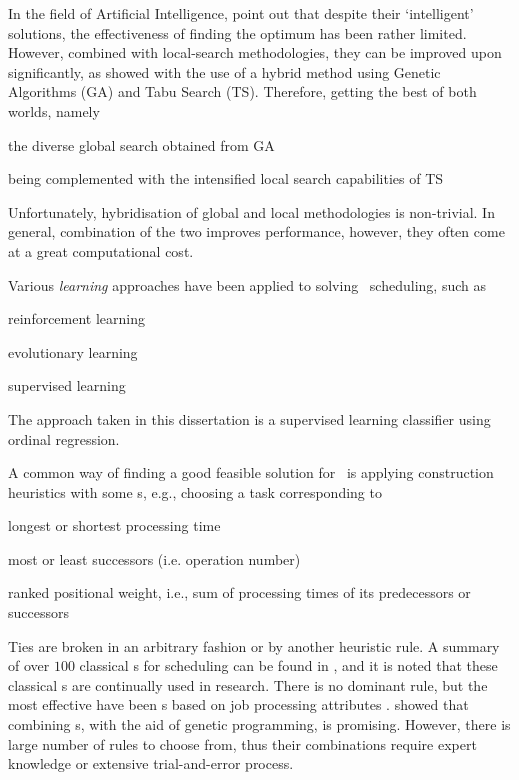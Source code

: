 In the field of Artificial Intelligence, \cite{Meeran12} point out that despite 
their `intelligent' solutions, the effectiveness of finding the optimum has 
been rather limited. However, combined with local-search methodologies, they 
can be improved upon significantly, as \citeauthor{Meeran12} showed with the 
use of a hybrid method using Genetic Algorithms (GA) and Tabu Search (TS). 
Therefore, getting the best of both worlds, namely
\begin{enumerate*}[label={{}}]
  \item the diverse global search obtained from GA 
  \item being complemented with the intensified local search capabilities of TS
\end{enumerate*}
Unfortunately, hybridisation of global and local methodologies is non-trivial. 
In general, combination of the two improves performance, however, they often 
come at a great computational cost.  

Various \emph{learning} approaches have been applied to solving \jsp\ 
scheduling, such as
\begin{enumerate*}
  \item reinforcement learning \citep{Zhang95}
  \item evolutionary learning \citep{Tay08}
  \item supervised learning \citep{Siggi05,Malik08}
\end{enumerate*}
The approach taken in this 
dissertation is a supervised learning classifier using ordinal regression. 


A common way of finding a good feasible solution for \JSP\ is 
applying construction heuristics with some \dr s, e.g., choosing a task 
corresponding to
\begin{enumerate*}[itemjoin*={{, or }}]
  \item longest or shortest processing time
  \item most or least successors (i.e. operation number)
  \item ranked positional weight, i.e., sum of processing times of its 
  predecessors or successors
\end{enumerate*} 
Ties are broken in an arbitrary fashion or by another heuristic rule.
A summary of over $100$ classical \dr s for scheduling can be found in 
\citet{Panwalkar77}, and it is noted that these classical \dr s are continually 
used in research.  
There is no dominant rule, but the most effective have been \sdr s based on job 
processing attributes \citep{Haupt89}. \citet{Tay08} showed that combining \dr 
s, with the aid of genetic programming, is promising. However, there is large 
number of rules to choose from, thus their combinations require expert 
knowledge or extensive trial-and-error process.

